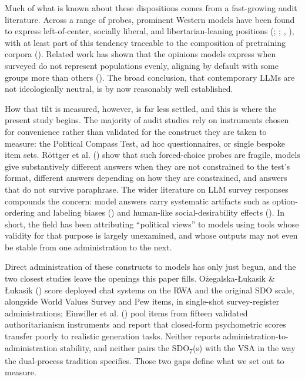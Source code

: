 \documentclass[
]{article}
\begin{document}
Much of what is known about these dispositions comes from a fast-growing
audit literature. Across a range of probes, prominent Western models
have been found to express left-of-center, socially liberal, and
libertarian-leaning positions (; ;
,
), with at least part of this tendency
traceable to the composition of pretraining corpora
(). Related work has shown
that the opinions models express when surveyed do not represent
populations evenly, aligning by default with some groups more than
others (). The broad
conclusion, that contemporary LLMs are not ideologically neutral, is by
now reasonably well established.

How that tilt is measured, however, is far less settled, and this is
where the present study begins. The majority of audit studies rely on
instruments chosen for convenience rather than validated for the
construct they are taken to measure: the Political Compass Test, ad hoc
questionnaires, or single bespoke item sets. Röttger et al.
() show that such forced-choice probes
are fragile, models give substantively different answers when they are
not constrained to the test's format, different answers depending on how
they are constrained, and answers that do not survive paraphrase. The
wider literature on LLM survey responses compounds the concern: model
answers carry systematic artifacts such as option-ordering and labeling
biases () and human-like social-desirability effects
(). In short, the field
has been attributing ``political views'' to models using tools whose
validity for that purpose is largely unexamined, and whose outputs may
not even be stable from one administration to the next.

Direct administration of these constructs to models has only just begun,
and the two closest studies leave the openings this paper fills.
Ożegalska-Łukasik \& Łukasik () score
deployed chat systems on the RWA and the original SDO scale, alongside
World Values Survey and Pew items, in single-shot survey-register
administrations; Einwiller et al. ()
pool items from fifteen validated authoritarianism instruments and
report that closed-form psychometric scores transfer poorly to realistic
generation tasks. Neither reports administration-to-administration
stability, and neither pairs the SDO\textsubscript{7}(s) with the VSA in
the way the dual-process tradition specifies. Those two gaps define what
we set out to measure.
\end{document}
